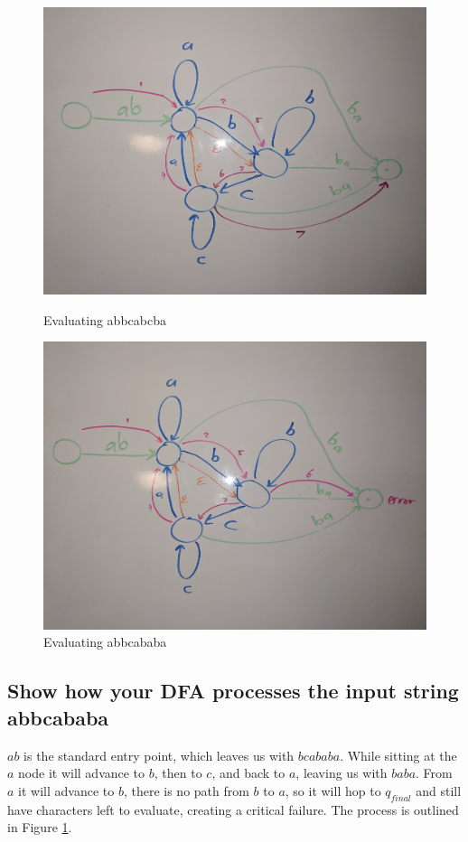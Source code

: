 \documentclass{article}
\begin{document}
\begin{figure}
\centering
\begin{minipage}{.5\textwidth}
  \centering
  \includegraphics[width=.75\linewidth]{images/p2-2}
  \caption{Evaluating abbcabcba}
  \label{fig:p2-2}
\end{minipage}%
\begin{minipage}{.5\textwidth}
  \centering
  \includegraphics[width=.75\linewidth]{images/p2-3}
  \caption{Evaluating abbcababa}
  \label{fig:p2-3}
\end{minipage}
\end{figure}


\subsection[Input String: abbcababa]{Show how your DFA processes the input 
string abbcababa}
$ab$ is the standard entry point, which leaves us with $bcababa$. While sitting 
at the $a$ node it will advance to $b$, then to $c$, and back to $a$, leaving us 
with $baba$. From $a$ it will advance to $b$, there is no path from $b$ to $a$, 
so it will hop to $q_{final}$ and still have characters left to evaluate, 
creating a critical failure. The process is outlined in Figure 
\ref{fig:p2-3}.
\end{document}
